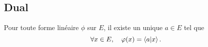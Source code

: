 \documentclass{magnolia}
\begin{document}
\subsection{Dual}

\begin{proposition}[utile=3]
  Pour toute forme linéaire $\phi$ sur $E$, il existe un unique $a\in E$ tel que
  \[\forall x\in E ,\quad \varphi(x)=\left\langle {a}\middle|{x}\right\rangle.\]
  \end{proposition}





\end{document}
